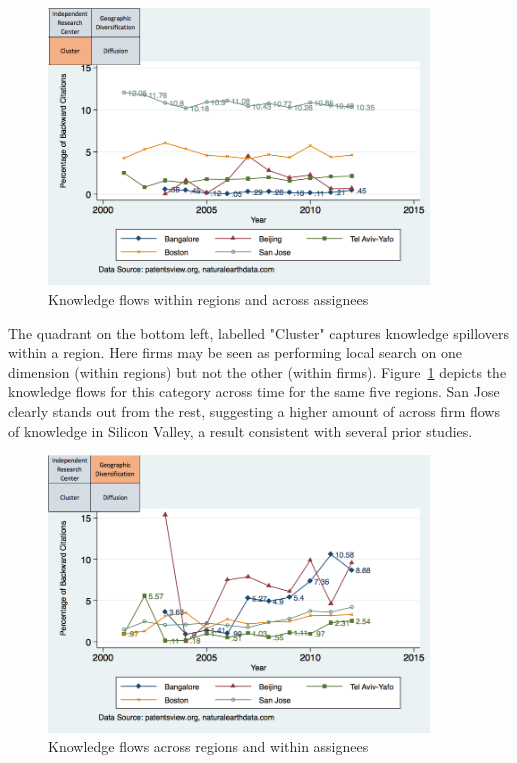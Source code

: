 \documentclass[parskip=full,12pt,letterpaper]{article}
\begin{document}
\begin{figure}[h!]
\begin{centering}
  \includegraphics[width=0.90\textwidth]{SMSSameRegionDiffAssigneeFlows}
  \caption{Knowledge flows within regions and across assignees}
  \label{fig:SMSSameRegionDiffAssigneeFlows}
\end{centering}
\end{figure}
The quadrant on the bottom left, labelled "Cluster" captures knowledge spillovers within a region. Here firms may be seen as performing local search on one dimension (within regions) but not the other (within firms). Figure~\ref{fig:SMSSameRegionDiffAssigneeFlows} depicts the knowledge flows for this category across time for the same five regions. San Jose clearly stands out from the rest, suggesting a higher amount of across firm flows of knowledge in Silicon Valley, a result consistent with several prior studies. \par
\begin{figure}[h!]
\begin{centering}
  \includegraphics[width=0.90\textwidth]{SMSDiffRegionSameAssigneeFlows}
  \caption{Knowledge flows across regions and within assignees}
  \label{fig:SMSDiffRegionSameAssigneeFlows}
\end{centering}
\end{figure}
\end{document}
